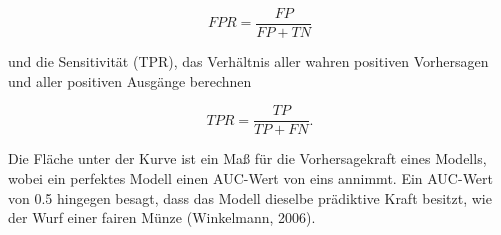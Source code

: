 \documentclass{article}
\begin{document}
\begin{equation}
FPR = \frac{FP}{FP + TN}
\end{equation}

und die Sensitivit{\"a}t (TPR), das Verh{\"a}ltnis aller wahren positiven Vorhersagen und aller positiven Ausg{\"a}nge berechnen

\begin{equation}
TPR = \frac{TP}{TP + FN}.
\end{equation}

Die Fl{\"a}che unter der Kurve ist ein Ma{\ss} f{\"u}r die Vorhersagekraft eines Modells, wobei ein perfektes Modell einen AUC-Wert von eins annimmt. Ein AUC-Wert von 0.5 hingegen besagt, dass das Modell dieselbe pr{\"a}diktive Kraft besitzt, wie der Wurf einer fairen M{\"u}nze (Winkelmann, 2006).
\end{document}
